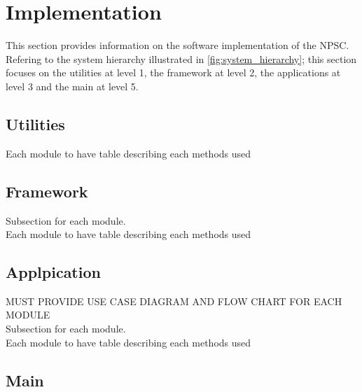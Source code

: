 \chapter{Implementation}
This section provides information on the software implementation of the NPSC. Refering to the system hierarchy illustrated in \cref{fig:system_hierarchy}; this section focuses on the utilities at level 1, the framework at level 2, the applications at level 3 and the main at level 5.
   
\section{Utilities}
Each module to have table describing each methods used\\

\section{Framework}
Subsection for each module.\\
Each module to have table describing each methods used\\

\section{Applpication}
MUST PROVIDE USE CASE DIAGRAM AND FLOW CHART FOR EACH MODULE\\
Subsection for each module.\\
Each module to have table describing each methods used\\

\section{Main}